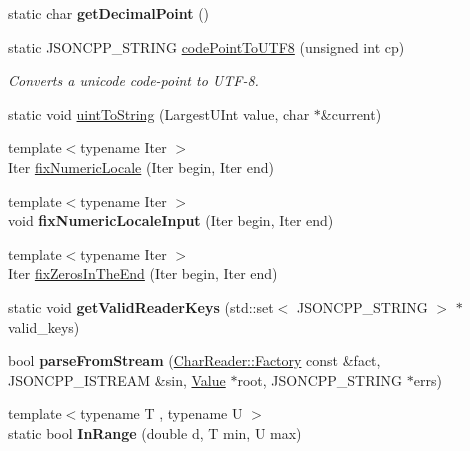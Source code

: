 \begin{DoxyCompactItemize}
static char {\bfseries get\+Decimal\+Point} ()
\item 
\mbox{\label{namespaceJson_a33f8bda65a5b1fc4f5ddc39cb03dc742}} 
static J\+S\+O\+N\+C\+P\+P\+\_\+\+S\+T\+R\+I\+NG \hyperlink{namespaceJson_a33f8bda65a5b1fc4f5ddc39cb03dc742}{code\+Point\+To\+U\+T\+F8} (unsigned int cp)
\begin{DoxyCompactList}\small\item\em Converts a unicode code-\/point to U\+T\+F-\/8. \end{DoxyCompactList}\item 
static void \hyperlink{namespaceJson_ac1ffd21a9e55122014353c773ccc496e}{uint\+To\+String} (Largest\+U\+Int value, char $\ast$\&current)
\item 
{\footnotesize template$<$typename Iter $>$ }\\Iter \hyperlink{namespaceJson_a4f93f184c2890cb99b07afeed10a89ec}{fix\+Numeric\+Locale} (Iter begin, Iter end)
\item 
\mbox{\label{namespaceJson_adc6272a7aca28093bc7232ada8607fe4}} 
{\footnotesize template$<$typename Iter $>$ }\\void {\bfseries fix\+Numeric\+Locale\+Input} (Iter begin, Iter end)
\item 
{\footnotesize template$<$typename Iter $>$ }\\Iter \hyperlink{namespaceJson_ae7b26e19e40cb18a11568cb477ff1743}{fix\+Zeros\+In\+The\+End} (Iter begin, Iter end)
\item 
\mbox{\label{namespaceJson_a8c38450840f3d88e9b981ae132f7ad0a}} 
static void {\bfseries get\+Valid\+Reader\+Keys} (std\+::set$<$ J\+S\+O\+N\+C\+P\+P\+\_\+\+S\+T\+R\+I\+NG $>$ $\ast$valid\+\_\+keys)
\item 
\mbox{\label{namespaceJson_a38f903cfdb57a6c4e86a7dcc42f3712c}} 
bool {\bfseries parse\+From\+Stream} (\hyperlink{classJson_1_1CharReader_1_1Factory}{Char\+Reader\+::\+Factory} const \&fact, J\+S\+O\+N\+C\+P\+P\+\_\+\+I\+S\+T\+R\+E\+AM \&sin, \hyperlink{classJson_1_1Value}{Value} $\ast$root, J\+S\+O\+N\+C\+P\+P\+\_\+\+S\+T\+R\+I\+NG $\ast$errs)
\item 
\mbox{\label{namespaceJson_aff0180507262a244de61b961178d7443}} 
{\footnotesize template$<$typename T , typename U $>$ }\\static bool {\bfseries In\+Range} (double d, T min, U max)

\end{DoxyCompactItemize}
